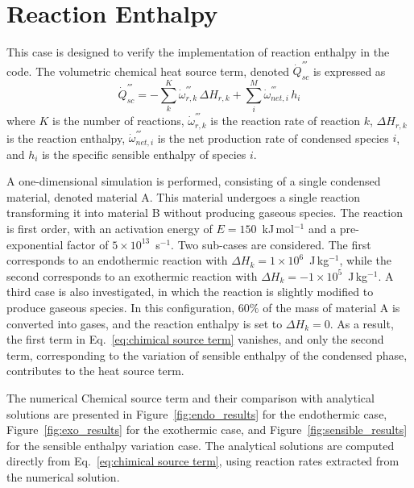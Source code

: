 \documentclass[12pt]{article}
\begin{document}
\fi

\section{Reaction Enthalpy}

This case is designed to verify the implementation of reaction enthalpy in the code. The volumetric chemical heat source term, denoted $\dot{Q}^{'''}_{sc}$ is expressed as
\begin{equation}
\dot{Q}^{'''}_{sc} = - \sum_{k}^{K} \dot{\omega}^{'''}_{r,k} \, \Delta H_{r,k}
+ \sum_{i}^{M} \dot{\omega}^{'''}_{net,i} \, h_i 
\label{eq:chimical source term}
\end{equation}
where $K$ is the number of reactions, $\dot{\omega}^{'''}_{r,k}$ is the reaction rate of reaction $k$, $\Delta H_{r,k}$ is the reaction enthalpy, $\dot{\omega}^{'''}_{net,i}$ is the net production rate of condensed species $i$, and $h_i$ is the specific sensible enthalpy of species $i$.

A one-dimensional simulation is performed, consisting of a single condensed material, denoted material A. This material undergoes a single reaction transforming it into material B without producing gaseous species. The reaction is first order, with an activation energy of $E = 150$~kJ\,mol$^{-1}$ and a pre-exponential factor of $5 \times 10^{13}$~s$^{-1}$. Two sub-cases are considered. The first corresponds to an endothermic reaction with $\Delta H_k = 1 \times 10^{6}$~J\,kg$^{-1}$, while the second corresponds to an exothermic reaction with $\Delta H_k = -1 \times 10^{5}$~J\,kg$^{-1}$. A third case is also investigated, in which the reaction is slightly modified to produce gaseous species. In this configuration, $60\%$ of the mass of material A is converted into gases, and the reaction enthalpy is set to $\Delta H_k = 0$. As a result, the first term in Eq.~\ref{eq:chimical source term} vanishes, and only the second term, corresponding to the variation of sensible enthalpy of the condensed phase, contributes to the heat source term.

The numerical Chemical source term and their comparison with analytical solutions are presented in Figure~\ref{fig:endo_results} for the endothermic case, Figure~\ref{fig:exo_results} for the exothermic case, and Figure~\ref{fig:sensible_results} for the sensible enthalpy variation case. The analytical solutions are computed directly from Eq.~\ref{eq:chimical source term}, using reaction rates extracted from the numerical solution.
\end{document}
